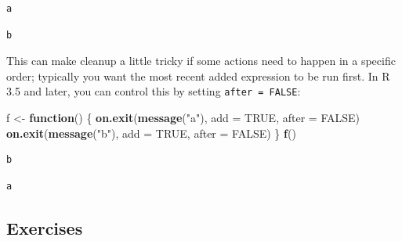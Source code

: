 \documentclass[]{book}
\newenvironment{Shaded}{\begin{snugshade}}{\end{snugshade}}
\newcommand{\ControlFlowTok}[1]{\textcolor[rgb]{0.13,0.29,0.53}{\textbf{#1}}}
\newcommand{\DataTypeTok}[1]{\textcolor[rgb]{0.13,0.29,0.53}{#1}}
\newcommand{\KeywordTok}[1]{\textcolor[rgb]{0.13,0.29,0.53}{\textbf{#1}}}
\newcommand{\NormalTok}[1]{#1}
\newcommand{\OtherTok}[1]{\textcolor[rgb]{0.56,0.35,0.01}{#1}}
\newcommand{\StringTok}[1]{\textcolor[rgb]{0.31,0.60,0.02}{#1}}
\theoremstyle{definition}
\theoremstyle{definition}
\theoremstyle{definition}
\theoremstyle{remark}
\begin{document}
\begin{verbatim}
a
\end{verbatim}

\begin{verbatim}
b
\end{verbatim}

This can make cleanup a little tricky if some actions need to happen in
a specific order; typically you want the most recent added expression to
be run first. In R 3.5 and later, you can control this by setting
\texttt{after\ =\ FALSE}:

\begin{Shaded}
\begin{Highlighting}[]
\NormalTok{f <-}\StringTok{ }\ControlFlowTok{function}\NormalTok{() \{}
  \KeywordTok{on.exit}\NormalTok{(}\KeywordTok{message}\NormalTok{(}\StringTok{"a"}\NormalTok{), }\DataTypeTok{add =} \OtherTok{TRUE}\NormalTok{, }\DataTypeTok{after =} \OtherTok{FALSE}\NormalTok{)}
  \KeywordTok{on.exit}\NormalTok{(}\KeywordTok{message}\NormalTok{(}\StringTok{"b"}\NormalTok{), }\DataTypeTok{add =} \OtherTok{TRUE}\NormalTok{, }\DataTypeTok{after =} \OtherTok{FALSE}\NormalTok{)}
\NormalTok{\}}
\KeywordTok{f}\NormalTok{()}
\end{Highlighting}
\end{Shaded}

\begin{verbatim}
b
\end{verbatim}

\begin{verbatim}
a
\end{verbatim}

\hypertarget{exercises-4}{%
\subsection{Exercises}\label{exercises-4}}
\end{document}
